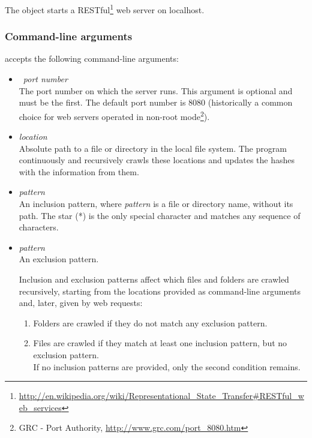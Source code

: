 The  object starts a RESTful\footnote{\url{http://en.wikipedia.org/wiki/Representational\_State\_Transfer\#RESTful\_web\_services}} web server on localhost. 

\subsubsection*{Command-line arguments}

 accepts the following command-line arguments:

\begin{center}  \end{center}

\begin{itemize}
\item {} \  \textit{port number} \\ 
        The port number on which the server runs. This argument is optional and must be the first. The default port number is 8080 (historically a common choice for web servers operated in non-root mode\footnote{GRC - Port Authority, \url{http://www.grc.com/port\_8080.htm}}).
\item \textit{location} \\
	Absolute path to a file or directory in the local file system. The program continuously and recursively crawls these locations and updates the hashes with the information from them. 

\item \ttt{+}\textit{pattern} \\
        An inclusion pattern, where \textit{pattern} is a file or directory name, without its path. The star (*) is the only special character and matches any sequence of characters.

\item \ttt{-}\textit{pattern} \\
        An exclusion pattern.

       Inclusion and exclusion patterns affect which files and folders are crawled recursively, starting from the locations provided as command-line arguments and, later, given by web requests:
	\begin{enumerate}
	\item  Folders are crawled if they do not match any exclusion pattern.
	\item  Files are crawled if they match at least one inclusion pattern, but no exclusion pattern. \\ If no inclusion patterns are provided, only the second condition remains. 
	\end{enumerate}
\end{itemize}


